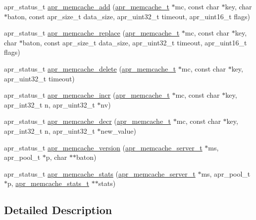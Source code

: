 \begin{DoxyCompactItemize}
\item 
apr\-\_\-status\-\_\-t \hyperlink{group___a_p_r___util___m_c_ga3c150706f243bf2b9cd89152d416ee56}{apr\-\_\-memcache\-\_\-add} (\hyperlink{structapr__memcache__t}{apr\-\_\-memcache\-\_\-t} $\ast$mc, const char $\ast$key, char $\ast$baton, const apr\-\_\-size\-\_\-t data\-\_\-size, apr\-\_\-uint32\-\_\-t timeout, apr\-\_\-uint16\-\_\-t flags)
\item 
apr\-\_\-status\-\_\-t \hyperlink{group___a_p_r___util___m_c_ga0f7b9fdb5d7a0a1feb5642d7778e268d}{apr\-\_\-memcache\-\_\-replace} (\hyperlink{structapr__memcache__t}{apr\-\_\-memcache\-\_\-t} $\ast$mc, const char $\ast$key, char $\ast$baton, const apr\-\_\-size\-\_\-t data\-\_\-size, apr\-\_\-uint32\-\_\-t timeout, apr\-\_\-uint16\-\_\-t flags)
\item 
apr\-\_\-status\-\_\-t \hyperlink{group___a_p_r___util___m_c_ga97d2c5be42ef773ba82fd8293b219ece}{apr\-\_\-memcache\-\_\-delete} (\hyperlink{structapr__memcache__t}{apr\-\_\-memcache\-\_\-t} $\ast$mc, const char $\ast$key, apr\-\_\-uint32\-\_\-t timeout)
\item 
apr\-\_\-status\-\_\-t \hyperlink{group___a_p_r___util___m_c_ga2cfc95fe963f2d4190996153a2ddb748}{apr\-\_\-memcache\-\_\-incr} (\hyperlink{structapr__memcache__t}{apr\-\_\-memcache\-\_\-t} $\ast$mc, const char $\ast$key, apr\-\_\-int32\-\_\-t n, apr\-\_\-uint32\-\_\-t $\ast$nv)
\item 
apr\-\_\-status\-\_\-t \hyperlink{group___a_p_r___util___m_c_gacf93837a1fd4c3d230644098f3043a39}{apr\-\_\-memcache\-\_\-decr} (\hyperlink{structapr__memcache__t}{apr\-\_\-memcache\-\_\-t} $\ast$mc, const char $\ast$key, apr\-\_\-int32\-\_\-t n, apr\-\_\-uint32\-\_\-t $\ast$new\-\_\-value)
\item 
apr\-\_\-status\-\_\-t \hyperlink{group___a_p_r___util___m_c_ga1d1b9478138b907eb9c10576cb1653ff}{apr\-\_\-memcache\-\_\-version} (\hyperlink{structapr__memcache__server__t}{apr\-\_\-memcache\-\_\-server\-\_\-t} $\ast$ms, apr\-\_\-pool\-\_\-t $\ast$p, char $\ast$$\ast$baton)
\item 
apr\-\_\-status\-\_\-t \hyperlink{group___a_p_r___util___m_c_gad81ba4ef97f7dd64e37a0fbb09677859}{apr\-\_\-memcache\-\_\-stats} (\hyperlink{structapr__memcache__server__t}{apr\-\_\-memcache\-\_\-server\-\_\-t} $\ast$ms, apr\-\_\-pool\-\_\-t $\ast$p, \hyperlink{structapr__memcache__stats__t}{apr\-\_\-memcache\-\_\-stats\-\_\-t} $\ast$$\ast$stats)
\end{DoxyCompactItemize}


\subsection{Detailed Description}



